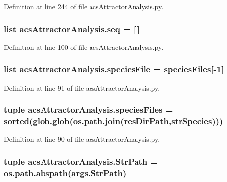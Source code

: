 Definition at line 244 of file acs\-Attractor\-Analysis.\-py.

\hypertarget{a00091_a33bc0e3fc99bab3df33d3f1626a19528}{
\subsubsection[{seq}]{\setlength{\rightskip}{0pt plus 5cm}list acs\-Attractor\-Analysis.\-seq = \mbox{[}$\,$\mbox{]}}}\label{a00091_a33bc0e3fc99bab3df33d3f1626a19528}


Definition at line 100 of file acs\-Attractor\-Analysis.\-py.

\hypertarget{a00091_a0e036b776f4f724254115c2e284657eb}{
\subsubsection[{species\-File}]{\setlength{\rightskip}{0pt plus 5cm}list acs\-Attractor\-Analysis.\-species\-File = {\bf species\-Files}\mbox{[}-\/1\mbox{]}}}\label{a00091_a0e036b776f4f724254115c2e284657eb}


Definition at line 91 of file acs\-Attractor\-Analysis.\-py.

\hypertarget{a00091_a670249d163388a9d93c8f3b9fb63afac}{
\subsubsection[{species\-Files}]{\setlength{\rightskip}{0pt plus 5cm}tuple acs\-Attractor\-Analysis.\-species\-Files = sorted(glob.\-glob(os.\-path.\-join({\bf res\-Dir\-Path},{\bf str\-Species})))}}\label{a00091_a670249d163388a9d93c8f3b9fb63afac}


Definition at line 90 of file acs\-Attractor\-Analysis.\-py.

\hypertarget{a00091_a8941499f40259763765b64e3185be82c}{
\subsubsection[{Str\-Path}]{\setlength{\rightskip}{0pt plus 5cm}tuple acs\-Attractor\-Analysis.\-Str\-Path = os.\-path.\-abspath(args.\-Str\-Path)}}\label{a00091_a8941499f40259763765b64e3185be82c}


